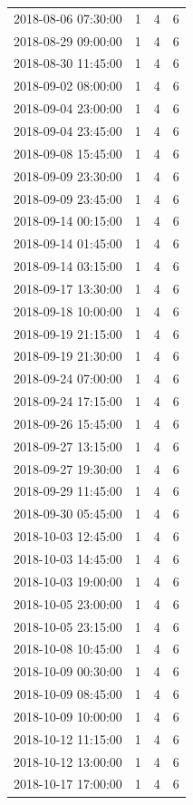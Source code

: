 \begin{tabular}{lrrr}
2018-08-06 07:30:00 & 1 & 4 & 6 \\
2018-08-29 09:00:00 & 1 & 4 & 6 \\
2018-08-30 11:45:00 & 1 & 4 & 6 \\
2018-09-02 08:00:00 & 1 & 4 & 6 \\
2018-09-04 23:00:00 & 1 & 4 & 6 \\
2018-09-04 23:45:00 & 1 & 4 & 6 \\
2018-09-08 15:45:00 & 1 & 4 & 6 \\
2018-09-09 23:30:00 & 1 & 4 & 6 \\
2018-09-09 23:45:00 & 1 & 4 & 6 \\
2018-09-14 00:15:00 & 1 & 4 & 6 \\
2018-09-14 01:45:00 & 1 & 4 & 6 \\
2018-09-14 03:15:00 & 1 & 4 & 6 \\
2018-09-17 13:30:00 & 1 & 4 & 6 \\
2018-09-18 10:00:00 & 1 & 4 & 6 \\
2018-09-19 21:15:00 & 1 & 4 & 6 \\
2018-09-19 21:30:00 & 1 & 4 & 6 \\
2018-09-24 07:00:00 & 1 & 4 & 6 \\
2018-09-24 17:15:00 & 1 & 4 & 6 \\
2018-09-26 15:45:00 & 1 & 4 & 6 \\
2018-09-27 13:15:00 & 1 & 4 & 6 \\
2018-09-27 19:30:00 & 1 & 4 & 6 \\
2018-09-29 11:45:00 & 1 & 4 & 6 \\
2018-09-30 05:45:00 & 1 & 4 & 6 \\
2018-10-03 12:45:00 & 1 & 4 & 6 \\
2018-10-03 14:45:00 & 1 & 4 & 6 \\
2018-10-03 19:00:00 & 1 & 4 & 6 \\
2018-10-05 23:00:00 & 1 & 4 & 6 \\
2018-10-05 23:15:00 & 1 & 4 & 6 \\
2018-10-08 10:45:00 & 1 & 4 & 6 \\
2018-10-09 00:30:00 & 1 & 4 & 6 \\
2018-10-09 08:45:00 & 1 & 4 & 6 \\
2018-10-09 10:00:00 & 1 & 4 & 6 \\
2018-10-12 11:15:00 & 1 & 4 & 6 \\
2018-10-12 13:00:00 & 1 & 4 & 6 \\
2018-10-17 17:00:00 & 1 & 4 & 6 \\

\end{tabular}
